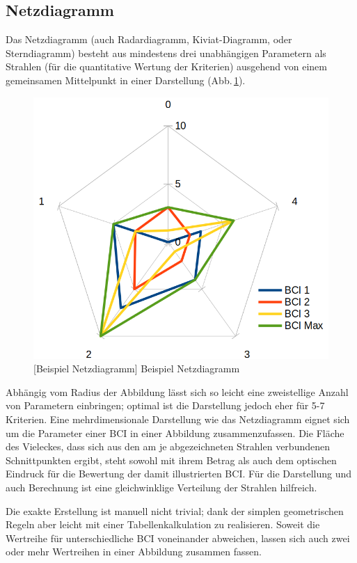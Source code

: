 \subsection{Netzdiagramm}\label{dep:web}

Das Netzdiagramm (auch Radardiagramm, Kiviat-Diagramm, oder Sterndiagramm) besteht aus mindestens drei unabhängigen Parametern als Strahlen (für die quantitative Wertung der Kriterien) ausgehend von einem gemeinsamen Mittelpunkt in einer Darstellung (Abb.\,\ref{disp:web:pic}).

\begin{figure}[!htp]
\centering
\includegraphics[width=.6\textwidth]{img/disp-web}
[Beispiel Netzdiagramm]{\label{disp:web:pic} Beispiel Netzdiagramm}
\end{figure}

Abhängig vom Radius der Abbildung lässt sich so leicht eine zweistellige Anzahl von Parametern einbringen;
optimal ist die Darstellung jedoch eher für 5-7 Kriterien.
Eine mehrdimensionale Darstellung wie das Netzdiagramm eignet sich um die Parameter einer \gls{BCI} in einer Abbildung zusammenzufassen.
Die Fläche des Vieleckes, dass sich aus den am je abgezeichneten Strahlen verbundenen Schnittpunkten ergibt, steht sowohl mit ihrem Betrag als auch dem optischen Eindruck für die Bewertung der damit illustrierten \gls{BCI}.
Für die Darstellung und auch Berechnung ist eine gleichwinklige Verteilung der Strahlen hilfreich.

Die exakte Erstellung ist manuell nicht trivial; dank der simplen geometrischen Regeln aber leicht mit \ua{} einer Tabellenkalkulation zu realisieren.
Soweit die Wertreihe für unterschiedliche \gls{BCI} voneinander abweichen, lassen sich auch zwei oder mehr Wertreihen in einer Abbildung zusammen fassen.

